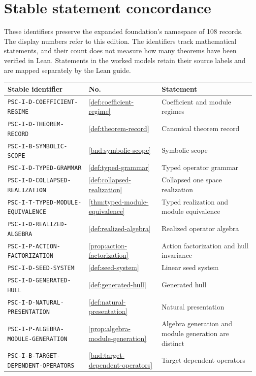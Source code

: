 \section{Stable statement concordance}\label{app:stable-concordance}
These identifiers preserve the expanded foundation's namespace of 108 records. The display numbers refer to this edition. The identifiers track mathematical statements, and their count does not measure how many theorems have been verified in Lean. Statements in the worked models retain their source labels and are mapped separately by the Lean guide.
\small\begin{longtable}{@{}p{}p{}p{}@{}}
\toprule Stable identifier & No. & Statement\\\midrule\endhead
\nolinkurl{PSC-I-D-COEFFICIENT-REGIME} & \ref{def:coefficient-regime} & Coefficient and module regimes \\
\nolinkurl{PSC-I-D-THEOREM-RECORD} & \ref{def:theorem-record} & Canonical theorem record \\
\nolinkurl{PSC-I-B-SYMBOLIC-SCOPE} & \ref{bnd:symbolic-scope} & Symbolic scope \\
\nolinkurl{PSC-I-D-TYPED-GRAMMAR} & \ref{def:typed-grammar} & Typed operator grammar \\
\nolinkurl{PSC-I-D-COLLAPSED-REALIZATION} & \ref{def:collapsed-realization} & Collapsed one space realization \\
\nolinkurl{PSC-I-T-TYPED-MODULE-EQUIVALENCE} & \ref{thm:typed-module-equivalence} & Typed realization and module equivalence \\
\nolinkurl{PSC-I-D-REALIZED-ALGEBRA} & \ref{def:realized-algebra} & Realized operator algebra \\
\nolinkurl{PSC-I-P-ACTION-FACTORIZATION} & \ref{prop:action-factorization} & Action factorization and hull invariance \\
\nolinkurl{PSC-I-D-SEED-SYSTEM} & \ref{def:seed-system} & Linear seed system \\
\nolinkurl{PSC-I-D-GENERATED-HULL} & \ref{def:generated-hull} & Generated hull \\
\nolinkurl{PSC-I-D-NATURAL-PRESENTATION} & \ref{def:natural-presentation} & Natural presentation \\
\nolinkurl{PSC-I-P-ALGEBRA-MODULE-GENERATION} & \ref{prop:algebra-module-generation} & Algebra generation and module generation are distinct \\
\nolinkurl{PSC-I-B-TARGET-DEPENDENT-OPERATORS} & \ref{bnd:target-dependent-operators} & Target dependent operators \\

\end{longtable}
